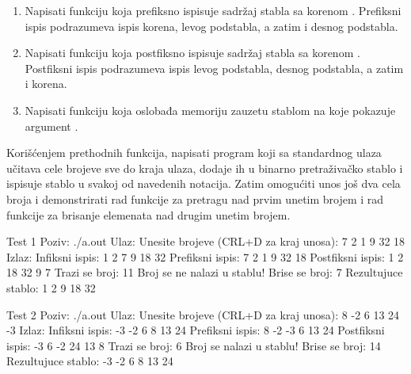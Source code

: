\begin{Exercise}[label=701]
\begin{enumerate}
\item Napisati funkciju  koja prefiksno ispisuje sadržaj stabla sa korenom . Prefiksni ispis podrazumeva ispis korena, levog podstabla, a zatim i desnog podstabla.

\item Napisati funkciju  koja postfiksno ispisuje sadržaj stabla sa korenom . Postfiksni ispis podrazumeva ispis levog podstabla, desnog podstabla, a zatim i korena.

\item Napisati funkciju  koja oslobađa memoriju zauzetu stablom na koje pokazuje argument .
\end{enumerate}

Korišćenjem prethodnih funkcija, napisati program koji sa standardnog ulaza učitava cele brojeve sve do kraja ulaza, dodaje ih u binarno pretraživačko stablo i ispisuje stablo u svakoj od navedenih notacija. Zatim omogućiti unos još dva cela broja i demonstrirati rad funkcije za pretragu nad prvim unetim brojem i rad funkcije za brisanje elemenata nad drugim unetim brojem. 

\begin{maxitest}
\begin{test}{Test 1}
Poziv: ./a.out
Ulaz:
	Unesite brojeve (CRL+D za kraj unosa): 7 2 1 9 32 18
Izlaz:
	Infiksni ispis: 1 2 7 9 18 32
	Prefiksni ispis: 7 2 1 9 32 18
	Postfiksni ispis: 1 2 18 32 9 7
	Trazi se broj: 11
	Broj se ne nalazi u stablu!
	Brise se broj: 7
	Rezultujuce stablo: 1 2 9 18 32
\end{test}
\end{maxitest}

\begin{maxitest}
\begin{test}{Test 2}
Poziv: ./a.out
Ulaz:
	Unesite brojeve (CRL+D za kraj unosa): 8 -2 6 13 24 -3
Izlaz:
	Infiksni ispis:  -3 -2 6 8 13 24
	Prefiksni ispis: 8 -2 -3 6 13 24
	Postfiksni ispis: -3 6 -2 24 13 8 
	Trazi se broj: 6
	Broj se nalazi u stablu!
	Brise se broj: 14
	Rezultujuce stablo: -3 -2 6 8 13 24
\end{test}
\end{maxitest}

\end{Exercise}

\begin{Answer}[ref=701]
\end{Answer}


